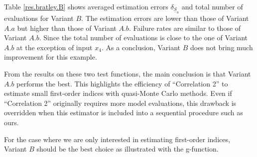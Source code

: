 Table \ref{res.bratley.B} shows averaged estimation errors $\delta_{\underline{S}_u}$ and total number of evaluations for Variant $B$. The estimation errors are lower than those of Variant $A.a$ but higher than those of Variant $A.b$. Failure rates are similar to those of Variant $A.b$. Since the total number of evaluations is close to the one of Variant $A.b$ at the exception of input $x_4$. As a conclusion, Variant $B$ does not bring much improvement for this example.
\bigskip

From the results on these two test functions, the main conclusion is that Variant $A.b$ performs the best. This highlights the efficiency of ``Correlation 2'' to estimate small first-order indices with quasi-Monte Carlo methods. Even if ``Correlation 2'' originally requires more model evaluations, this drawback is overridden when this estimator is included into a sequential procedure such as ours. 

For the case where we are only interested in estimating first-order indices, Variant $B$ should be the best choice as illustrated with the g-function.

